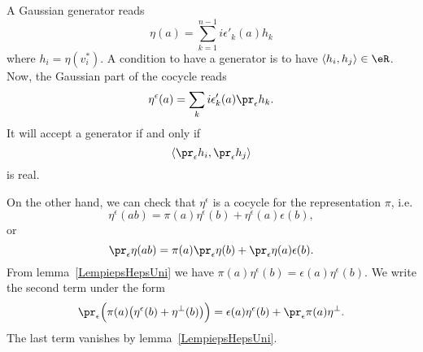 A Gaussian generator reads
\begin{equation}
    \eta(a)=\sum_{k=1}^{n-1}i\epsilon'_k(a)h_k
\end{equation}
where \(h_i=\eta(v_i^*)\). A condition to have a generator is to have \(\langle h_i, h_j\rangle \in\eR\). Now, the Gaussian part of the cocycle reads
\begin{equation}
    \eta^{\epsilon}(a)=\sum_ki\epsilon'_k(a)\pr_{\epsilon}h_k.
\end{equation}
It will accept a generator if and only if
\begin{equation}
    \langle \pr_{\epsilon}h_i, \pr_{\epsilon}h_j\rangle
\end{equation}
is real.

On the other hand, we can check that \(\eta^{\epsilon}\) is a cocycle for the representation \(\pi\), i.e.
\begin{equation}
    \eta^{\epsilon}(ab)=\pi(a)\eta^{\epsilon}(b)+\eta^{\epsilon}(a)\epsilon(b),
\end{equation}
or
\begin{equation}
    \pr_{\epsilon}\eta(ab)=\pi(a)\pr_{\epsilon}\eta(b)+\pr_{\epsilon}\eta(a)\epsilon(b).
\end{equation}
From lemma~\ref{LempiepsHepsUni} we have \(\pi(a)\eta^{\epsilon}(b)=\epsilon(a)\eta^{\epsilon}(b)\). We write the second term under the form
\begin{equation}
    \pr_{\epsilon}\Big( \pi(a)\big( \eta^{\epsilon}(b)+\eta^{\perp}(b) \big) \Big)=\epsilon(a)\eta^{\epsilon}(b)+\pr_{\epsilon}\pi(a)\eta^{\perp}.
\end{equation}
The last term vanishes by lemma~\ref{LempiepsHepsUni}.
